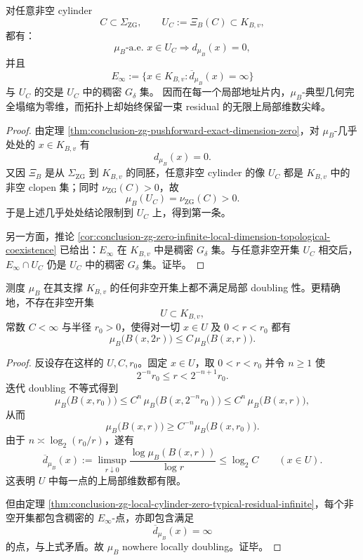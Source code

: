 \begin{theorem}\label{thm:conclusion-zg-local-cylinder-zero-typical-residual-infinite}
对任意非空 cylinder
\[
C\subset \Sigma_{\mathrm{ZG}},
\qquad
U_C:=\Xi_B(C)\subset K_{B,v},
\]
都有：
\[
\mu_B\text{-a.e. }x\in U_C
\Longrightarrow
d_{\mu_B}(x)=0,
\]
并且
\[
E_\infty
:=
\{x\in K_{B,v}:\overline d_{\mu_B}(x)=\infty\}
\]
与 \(U_C\) 的交是 \(U_C\) 中的稠密 \(G_\delta\) 集。
因而在每一个局部地址片内，\(\mu_B\)-典型几何完全塌缩为零维，而拓扑上却始终保留一束 residual 的无限上局部维数尖峰。
\end{theorem}
\begin{proof}
由定理 \ref{thm:conclusion-zg-pushforward-exact-dimension-zero}，对 \(\mu_B\)-几乎处处的 \(x\in K_{B,v}\) 有
\[
d_{\mu_B}(x)=0.
\]
又因 \(\Xi_B\) 是从 \(\Sigma_{\mathrm{ZG}}\) 到 \(K_{B,v}\) 的同胚，任意非空 cylinder 的像 \(U_C\) 都是 \(K_{B,v}\) 中的非空 clopen 集；同时 \(\nu_{\mathrm{ZG}}(C)>0\)，故
\[
\mu_B(U_C)=\nu_{\mathrm{ZG}}(C)>0.
\]
于是上述几乎处处结论限制到 \(U_C\) 上，得到第一条。

另一方面，推论 \ref{cor:conclusion-zg-zero-infinite-local-dimension-topological-coexistence} 已给出：\(E_\infty\) 在 \(K_{B,v}\) 中是稠密 \(G_\delta\) 集。与任意非空开集 \(U_C\) 相交后，\(E_\infty\cap U_C\) 仍是 \(U_C\) 中的稠密 \(G_\delta\) 集。证毕。
\end{proof}

\begin{theorem}\label{thm:conclusion-zg-nowhere-locally-doubling}
测度 \(\mu_B\) 在其支撑 \(K_{B,v}\) 的任何非空开集上都不满足局部 doubling 性。更精确地，不存在非空开集
\[
U\subset K_{B,v},
\]
常数 \(C<\infty\) 与半径 \(r_0>0\)，使得对一切 \(x\in U\) 及 \(0<r<r_0\) 都有
\[
\mu_B\bigl(B(x,2r)\bigr)\le C\,\mu_B\bigl(B(x,r)\bigr).
\]
\end{theorem}
\begin{proof}
反设存在这样的 \(U,C,r_0\)。固定 \(x\in U\)，取 \(0<r<r_0\) 并令 \(n\ge 1\) 使
\[
2^{-n}r_0\le r<2^{-n+1}r_0.
\]
迭代 doubling 不等式得到
\[
\mu_B\bigl(B(x,r_0)\bigr)
\le
C^n\,\mu_B\bigl(B(x,2^{-n}r_0)\bigr)
\le
C^n\,\mu_B\bigl(B(x,r)\bigr),
\]
从而
\[
\mu_B\bigl(B(x,r)\bigr)\ge C^{-n}\mu_B\bigl(B(x,r_0)\bigr).
\]
由于 \(n\asymp \log_2(r_0/r)\)，遂有
\[
\overline d_{\mu_B}(x)
:=
\limsup_{r\downarrow 0}
\frac{\log \mu_B(B(x,r))}{\log r}
\le
\log_2 C
\qquad (x\in U).
\]
这表明 \(U\) 中每一点的上局部维数都有限。

但由定理 \ref{thm:conclusion-zg-local-cylinder-zero-typical-residual-infinite}，每个非空开集都包含稠密的 \(E_\infty\)-点，亦即包含满足
\[
\overline d_{\mu_B}(x)=\infty
\]
的点，与上式矛盾。故 \(\mu_B\) nowhere locally doubling。证毕。
\end{proof}

